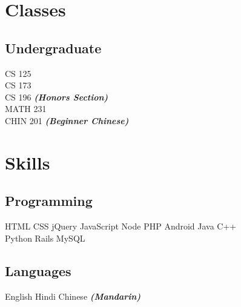 \documentclass[]{deedy-resume-openfont}
\begin{document}
\begin{minipage}[t]{0.28\textwidth}

\section{Classes}
\subsection{Undergraduate}
CS 125\\
CS 173\\
CS 196
{\footnotesize \textit{\textbf{(Honors Section) }}} \\
MATH 231\\
CHIN 201 {\footnotesize \textit{\textbf{(Beginner Chinese) }}}
\sectionsep


\section{Skills}
\subsection{Programming}
HTML \textbullet{} CSS \textbullet{} jQuery \textbullet{} JavaScript \textbullet{} Node \textbullet{} PHP \textbullet{} Android \textbullet{} Java \textbullet{} C++\\
 Python  \textbullet{} Rails \textbullet{} MySQL
\sectionsep
\subsection{Languages}
English \textbullet{} Hindi \textbullet{} Chinese {\footnotesize \textit{\textbf{(Mandarin) }}}
\sectionsep

%
%

\end{minipage} 
\hfill
\end{document}
